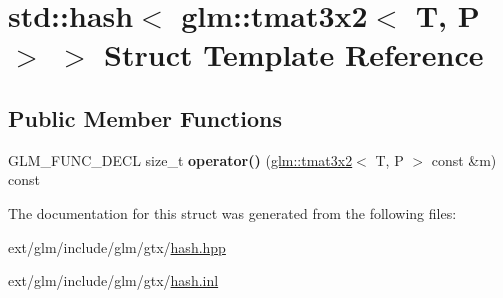 \hypertarget{structstd_1_1hash_3_01glm_1_1tmat3x2_3_01_t_00_01_p_01_4_01_4}{\section{std\-:\-:hash$<$ glm\-:\-:tmat3x2$<$ T, P $>$ $>$ Struct Template Reference}
\label{structstd_1_1hash_3_01glm_1_1tmat3x2_3_01_t_00_01_p_01_4_01_4}
}
\subsection*{Public Member Functions}
\begin{DoxyCompactItemize}
\item 
\hypertarget{structstd_1_1hash_3_01glm_1_1tmat3x2_3_01_t_00_01_p_01_4_01_4_a69360bae70245b0bc1a207b50a1c88a1}{G\-L\-M\-\_\-\-F\-U\-N\-C\-\_\-\-D\-E\-C\-L size\-\_\-t {\bfseries operator()} (\hyperlink{structglm_1_1tmat3x2}{glm\-::tmat3x2}$<$ T, P $>$ const \&m) const }\label{structstd_1_1hash_3_01glm_1_1tmat3x2_3_01_t_00_01_p_01_4_01_4_a69360bae70245b0bc1a207b50a1c88a1}

\end{DoxyCompactItemize}


The documentation for this struct was generated from the following files\-:\begin{DoxyCompactItemize}
\item 
ext/glm/include/glm/gtx/\hyperlink{hash_8hpp}{hash.\-hpp}\item 
ext/glm/include/glm/gtx/\hyperlink{hash_8inl}{hash.\-inl}\end{DoxyCompactItemize}
